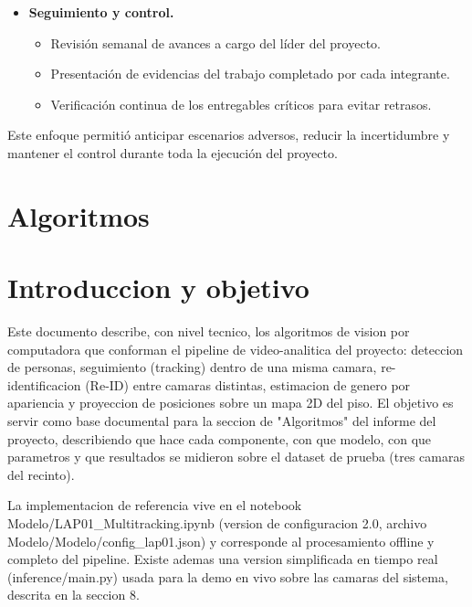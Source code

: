 \documentclass[12pt,letterpaper]{article}
\begin{document}
\begin{itemize}
    \item \textbf{Seguimiento y control.}
    \begin{itemize}
        \item Revisión semanal de avances a cargo del líder del proyecto.
        \item Presentación de evidencias del trabajo completado por cada
        integrante.
        \item Verificación continua de los entregables críticos para
        evitar retrasos.
    \end{itemize}
\end{itemize}

Este enfoque permitió anticipar escenarios adversos, reducir la
incertidumbre y mantener el control durante toda la ejecución del
proyecto.

\section{ Algoritmos}
    \maketitle
\section{Introduccion y objetivo}

Este documento describe, con nivel tecnico, los algoritmos de vision por computadora que conforman el pipeline de video-analitica del proyecto: deteccion de personas, seguimiento (tracking) dentro de una misma camara, re-identificacion (Re-ID) entre camaras distintas, estimacion de genero por apariencia y proyeccion de posiciones sobre un mapa 2D del piso. El objetivo es servir como base documental para la seccion de "Algoritmos" del informe del proyecto, describiendo que hace cada componente, con que modelo, con que parametros y que resultados se midieron sobre el dataset de prueba (tres camaras del recinto).


La implementacion de referencia vive en el notebook Modelo/\allowbreak LAP01\_\allowbreak Multitracking.ipynb (version de configuracion 2.0, archivo Modelo/\allowbreak Modelo/\allowbreak config\_\allowbreak lap01.json) y corresponde al procesamiento offline y completo del pipeline. Existe ademas una version simplificada en tiempo real (inference/main.py) usada para la demo en vivo sobre las camaras del sistema, descrita en la seccion 8.
\end{document}
